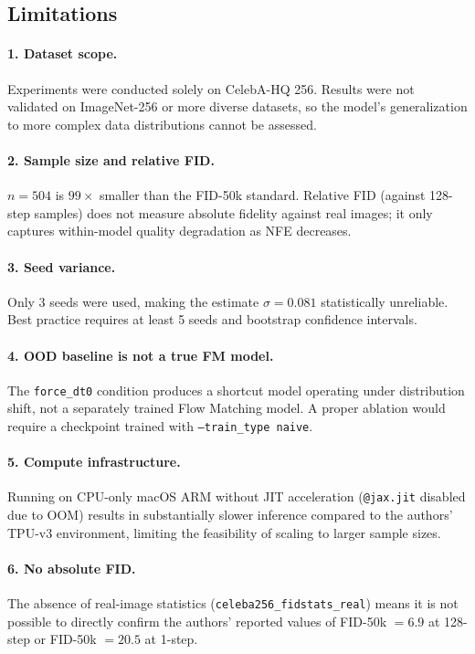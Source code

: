 \subsection{Limitations}
\label{sec:limitations}

\paragraph{1. Dataset scope.}
Experiments were conducted solely on CelebA-HQ 256.
Results were not validated on ImageNet-256 or more diverse datasets, so the
model's generalization to more complex data distributions cannot be assessed.

\paragraph{2. Sample size and relative FID.}
$n = 504$ is $99\times$ smaller than the FID-50k standard.
Relative FID (against 128-step samples) does not measure absolute fidelity
against real images; it only captures within-model quality degradation as NFE
decreases.

\paragraph{3. Seed variance.}
Only 3 seeds were used, making the estimate $\sigma = 0.081$ statistically
unreliable.
Best practice requires at least 5 seeds and bootstrap confidence intervals.

\paragraph{4. OOD baseline is not a true FM model.}
The \texttt{force\_dt0} condition produces a shortcut model operating under
distribution shift, not a separately trained Flow Matching model.
A proper ablation would require a checkpoint trained with
\texttt{--train\_type naive}.

\paragraph{5. Compute infrastructure.}
Running on CPU-only macOS ARM without JIT acceleration
(\texttt{@jax.jit} disabled due to OOM) results in substantially slower
inference compared to the authors' TPU-v3 environment, limiting the feasibility
of scaling to larger sample sizes.

\paragraph{6. No absolute FID.}
The absence of real-image statistics (\texttt{celeba256\_fidstats\_real})
means it is not possible to directly confirm the authors' reported values of
FID-50k $= 6.9$ at 128-step or FID-50k $= 20.5$ at 1-step.
